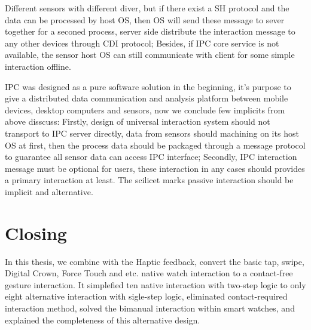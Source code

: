 Different sensors with different diver, but if there exist a SH protocol and the data can be processed by host OS, then OS will send these message to sever together for a seconed process, server side distribute the interaction message to any other devices through CDI protocol; Besides, if IPC core service is not available, the sensor host OS can still communicate with client for some simple interaction offline.


IPC was designed as a pure software solution in the beginning, it's purpose to give a distributed data communication and analysis platform between mobile devices, desktop computers and sensors, now we conclude few implicits from above disscuss:
Firstly, design of universal interaction system should not transport to IPC server directly, data from sensors should machining on its host OS at first, then the process data should be packaged through a message protocol to guarantee all sensor data can access IPC interface;
Secondly, IPC interaction message must be optional for users, these interaction in any cases should provides a primary interaction at least. The scilicet marks passive interaction should be implicit and alternative.

\section{Closing}

In this thesis, we combine with the Haptic feedback, convert the basic tap, swipe, Digital Crown, Force Touch and etc. native watch interaction to a contact-free gesture interaction. It simplefied ten native interaction with two-step logic to only eight alternative interaction with sigle-step logic, eliminated contact-required interaction method, solved the bimanual interaction within smart watches, and explained the completeness of this alternative design.

